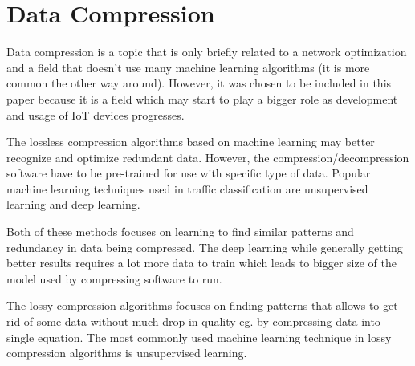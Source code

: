 \documentclass[conference]{IEEEtran}
\begin{document}
\section{Data Compression}
Data compression is a topic that is only briefly related to a network optimization and a field that doesn't use many machine learning algorithms (it is more common the other way around\cite{compression3}). However, it was chosen to be included in this paper because it is a field which may start to play a bigger role as development and usage of IoT devices progresses\cite{compression2}.\par
The lossless compression algorithms based on machine learning may better recognize and optimize redundant data. However, the compression/decompression software have to be pre-trained for use with specific type of data. Popular machine learning techniques used in traffic classification are unsupervised learning and deep learning\cite{compression1}\cite{compression4}.\par
Both of these methods focuses on learning to find similar patterns and redundancy in data being compressed. The deep learning while generally getting better results requires a lot more data to train which leads to bigger size of the model used by compressing software to run\cite{compression4}.\par
The lossy compression algorithms focuses on finding patterns that allows to get rid of some data without much drop in quality eg. by compressing data into single equation. The most commonly used machine learning technique in lossy compression algorithms is unsupervised learning\cite{compression2}.
\end{document}
